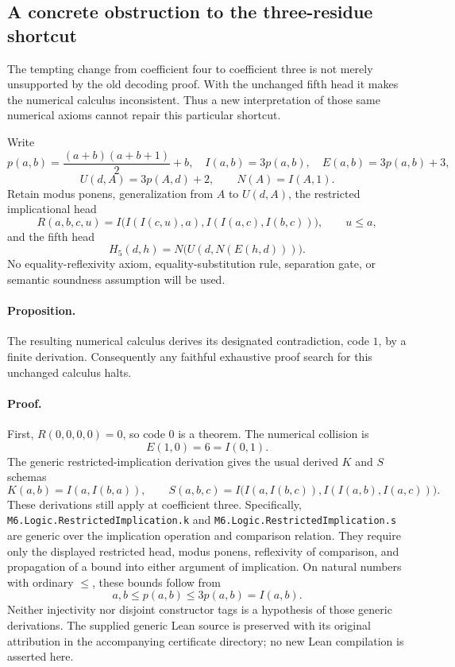 \providecommand{\file}[1]{\texttt{#1}}
\subsection{A concrete obstruction to the three-residue shortcut}
\label{sec:factor-three-obstruction}

The tempting change from coefficient four to coefficient three is not
merely unsupported by the old decoding proof.  With the unchanged fifth
head it makes the numerical calculus inconsistent.  Thus a new interpretation
of those same numerical axioms cannot repair this particular shortcut.

Write
\[
 p(a,b)=\frac{(a+b)(a+b+1)}2+b,
 \quad I(a,b)=3p(a,b),\quad E(a,b)=3p(a,b)+3,
\]
\[
 U(d,A)=3p(A,d)+2,\qquad N(A)=I(A,1).
\]
Retain modus ponens, generalization from $A$ to $U(d,A)$, the restricted
implicational head
\[
 R(a,b,c,u)=I\bigl(I(I(c,u),a),I(I(a,c),I(b,c))\bigr),
 \qquad u\le a,
\]
and the fifth head
\[
 H_5(d,h)=N\bigl(U(d,N(E(h,d)))\bigr).
\]
No equality-reflexivity axiom, equality-substitution rule, separation gate,
or semantic soundness assumption will be used.

\paragraph{Proposition.}
The resulting numerical calculus derives its designated contradiction,
code $1$, by a finite derivation.  Consequently any faithful exhaustive
proof search for this unchanged calculus halts.

\paragraph{Proof.}
First, $R(0,0,0,0)=0$, so code $0$ is a theorem.  The numerical collision is
\[
                 E(1,0)=6=I(0,1).
\]
The generic restricted-implication derivation gives the usual derived
$K$ and $S$ schemas
\[
 K(a,b)=I(a,I(b,a)),\qquad
 S(a,b,c)=I\bigl(I(a,I(b,c)),I(I(a,b),I(a,c))\bigr).
\]
These derivations still apply at coefficient three.  Specifically,
\file{M6.Logic.RestrictedImplication.k} and
\file{M6.Logic.RestrictedImplication.s} are generic over the implication
operation and comparison relation.  They require only the displayed
restricted head, modus ponens, reflexivity of comparison, and propagation
of a bound into either argument of implication.  On natural numbers with
ordinary $\le$, these bounds follow from
\[
                  a,b\le p(a,b)\le3p(a,b)=I(a,b).
\]
Neither injectivity nor disjoint constructor tags is a hypothesis of those
generic derivations.  The supplied generic Lean source is preserved with
its original attribution in the accompanying certificate directory; no
new Lean compilation is asserted here.


